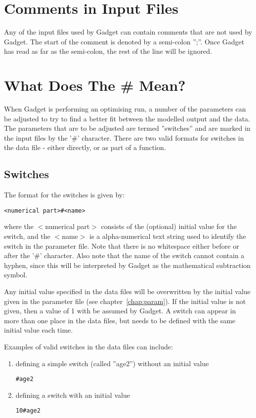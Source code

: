 \documentclass[10pt,twoside]{book}
\begin{document}
\section{Comments in Input Files}\label{sec:comments}
Any of the input files used by Gadget can contain comments that are not used by Gadget.  The start of the comment is denoted by a semi-colon '';''.  Once Gadget has read as far as the semi-colon, the rest of the line will be ignored.

\section{What Does The \# Mean?}\label{sec:whatdoeshash}
When Gadget is performing an optimising run, a number of the parameters can be adjusted to try to find a better fit between the modelled output and the data.  The parameters that are to be adjusted are termed ''switches'' and are marked in the input files by the '\#' character.  There are two valid formats for switches in the data file - either directly, or as part of a function.

\subsection{Switches}
The format for the switches is given by:

{\small\begin{verbatim}
<numerical part>#<name>
\end{verbatim}}

where the $<$numerical part$>$ consists of the (optional) initial value for the switch, and the $<$name$>$ is a alpha-numerical text string used to identify the switch in the parameter file.  Note that there is no whitespace either before or after the '\#' character.  Also note that the name of the switch cannot contain a hyphen, since this will be interpreted by Gadget as the mathematical subtraction symbol.

\bigskip
Any initial value specified in the data files will be overwritten by the initial value given in the parameter file (see chapter~\ref{chap:param}).  If the initial value is not given, then a value of 1 with be assumed by Gadget.  A switch can appear in more than one place in the data files, but needs to be defined with the same initial value each time.

\bigskip
Examples of valid switches in the data files can include:

\begin{enumerate}
\item defining a simple switch (called ''age2'') without an initial value
{\small\begin{verbatim}
#age2
\end{verbatim}}
\item defining a switch with an initial value
{\small\begin{verbatim}
10#age2
\end{verbatim}}
\end{enumerate}
\end{document}

